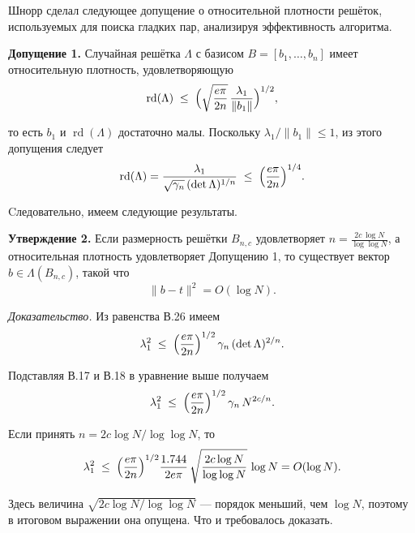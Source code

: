 Шнорр сделал следующее допущение о относительной плотности решёток,
используемых для поиска гладких пар, анализируя эффективность алгоритма.

\textbf{Допущение 1.}
Случайная решётка $\Lambda$ с базисом
$B=[b_{1},\dots,b_{n}]$ имеет относительную плотность, удовлетворяющую
\begin{equation}
\operatorname{rd}(\Lambda)
\;\le\;
\Bigl(
  \sqrt{\frac{e\pi}{2n}}\,
  \frac{\lambda_{1}}{\lVert b_{1}\rVert}
\Bigr)^{1/2},
\end{equation}

\noindent то есть $b_{1}$ и $\operatorname{rd}(\Lambda)$ достаточно малы. Поскольку
$\lambda_{1}/\lVert b_{1}\rVert\le 1$, из этого допущения следует
\begin{equation}
\operatorname{rd}(\Lambda)
  = \frac{\lambda_{1}}
         {\sqrt{\gamma_{n}}\,
          (\det\Lambda)^{1/n}}
  \;\le\;
  \Bigl(\frac{e\pi}{2n}\Bigr)^{1/4}.
\end{equation}

\noindent Cледовательно, имеем следующие результаты.

\textbf{Утверждение 2.} Если размерность решётки $B_{n,c}$ удовлетворяет $n =
\frac{2c\,\log N}{\log\log N}$, а относительная плотность удовлетворяет
Допущению 1, то существует вектор $b\in\Lambda(B_{n,c})$, такой что
\begin{equation}
 \lVert b - t\rVert^{2} = O(\log N).
\end{equation}

\textit{Доказательство.}
Из равенства В.26 имеем
\begin{equation}
  \lambda_{1}^{2}
  \;\le\;
  \Bigl(\frac{e\pi}{2n}\Bigr)^{1/2}\,
  \gamma_{n}\,(\det\Lambda)^{2/n}.
\end{equation}

\noindent Подставляя В.17 и В.18 в уравнение выше получаем
\begin{equation}
  \lambda_{1}^{2}
  \;\le\;
  \Bigl(\frac{e\pi}{2n}\Bigr)^{1/2}\,
  \gamma_{n}\,N^{2c/n}.
\end{equation}

\noindent Если принять $n = 2c\log N/\log\log N$, то
\begin{equation}
  \lambda_{1}^{2}
  \;\le\;
  \Bigl(\frac{e\pi}{2n}\Bigr)^{1/2}
  \frac{1.744}{2e\pi}\,
  \sqrt{\frac{2c\log N}{\log\log N}}\,
  \log N = O(\log N).
\end{equation}

Здесь величина $\sqrt{2c\log N/\log\log N}$ — порядок меньший, чем $\log N$,
поэтому в итоговом выражении она опущена. Что и требовалось доказать.

